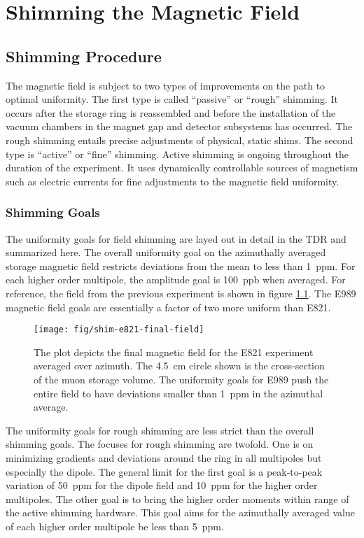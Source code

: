 \chapter {Shimming the Magnetic Field} \label{ch:shimming}

\section{Shimming Procedure}

The \gmtwo magnetic field is subject to two types of improvements on the path to optimal uniformity.  The first type is called ``passive'' or ``rough'' shimming.  It occurs after the storage ring is reassembled and before the installation of the vacuum chambers in the magnet gap and detector subsystems has occurred. The rough shimming entails precise adjustments of physical, static shims. The second type is ``active'' or ``fine'' shimming.  Active shimming is ongoing throughout the duration of the experiment.  It uses dynamically controllable sources of magnetism such as electric currents for fine adjustments to the magnetic field uniformity.

\subsection{Shimming Goals}
The uniformity goals for field shimming are layed out in detail in the TDR \cite{e989-tdr} and summarized here.  The overall uniformity goal on the azimuthally averaged storage magnetic field restricts deviations from the mean to less than \SI{1}{ppm}.  For each higher order multipole, the amplitude goal is \SI{100}{ppb} when averaged.  For reference, the field from the previous experiment is shown in figure \ref{fig:shim-e821-final-field}.  The E989 magnetic field goals are essentially a factor of two more uniform than E821.

\begin{figure}
\centering
\texttt{[image: fig/shim-e821-final-field]}
\caption{
    The plot depicts the final magnetic field for the E821 \gmtwo experiment averaged over azimuth.  The \SI{4.5}{\cm} circle shown is the cross-section of the muon storage volume.  The uniformity goals for E989 push the entire field to have deviations smaller than \SI{1}{ppm} in the azimuthal average. 
    \label{fig:shim-e821-final-field}
}
\end{figure}

The uniformity goals for rough shimming are less strict than the overall shimming goals.  The focuses for rough shimming are twofold. One is on minimizing gradients and deviations around the ring in all multipoles but especially the dipole.  The general limit for the first goal is a peak-to-peak variation of \SI{50}{ppm} for the dipole field and \SI{10}{ppm} for the higher order multipoles.  The other goal is to bring the higher order moments within range of the active shimming hardware.  This goal aims for the azimuthally averaged value of each higher order multipole be less than \SI{5}{ppm}.

